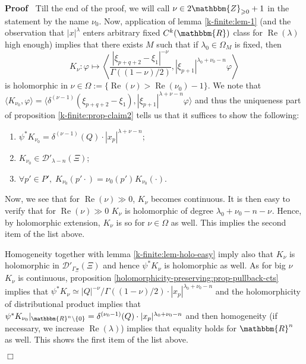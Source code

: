 \documentclass{article}
\newcommand{\assign}{:=}
\newcommand{\nocomma}{}
\newcommand{\tmop}[1]{\ensuremath{\operatorname{#1}}}
\newenvironment{proof}{\noindent\textbf{Proof\ }}{\hspace*{\fill}$\Box$\medskip}
\numberwithin{definition}{section}
\numberwithin{lemma}{section}
\numberwithin{proposition}{section}
{\theorembodyfont{\rmfamily}\newtheorem{remark}{Remark}
\numberwithin{remark}{section}
}
\begin{document}
\begin{proof}
  Till the end of the proof, we will call $\nu_{} \in 2\mathbbm{Z}_{\geqslant
  0} + 1$ in the statement by the name $\nu_0$. Now, application of lemma
  \ref{k-finite:lem-1} (and the observation that $| x |^{\lambda}$ enters
  arbitrary fixed $C^k ( \mathbbm{R})$ class for $\tmop{Re} ( \lambda)$ high
  enough) implies that there exists $M$ such that if $\lambda_0 \in \Omega_M$
  is fixed, then
  \[ K_{\nu} : \varphi \mapsto \left\langle \frac{| \xi_{p + q + 2} - \xi_1
     |^{- \nu}}{\Gamma ( ( 1 - \nu) / 2)} \nocomma, | \xi_{p + 1} |^{\lambda_0
     + \nu_0 - n} \varphi \nocomma \right\rangle \]
  is holomorphic in $\nu \in \Omega \assign \{ \tmop{Re} ( \nu) > \tmop{Re} (
  \nu_0) - 1 \}$. We note that $\langle K_{\nu_0}, \varphi \rangle = \langle
  \delta^{( \nu - 1)} ( \xi_{p + q + 2} - \xi_1) \nocomma, | \xi_{p + 1}
  |^{\lambda + \nu - n} \varphi \nocomma \rangle$ and thus the uniqueness part
  of proposition \ref{k-finite:prop-claim2} tells us that it suffices to show
  the following:
  \begin{enumerate}
    \item $\psi^{\ast} K_{\nu_0} = \delta^{( \nu - 1)} ( Q) \cdot | x_p
    |^{\lambda + \nu - n}$;
    
    \item $K_{\nu_0} \in \mathcal{D}'_{\lambda - n} ( \Xi)$;
    
    \item $\forall p' \in P', \; K_{\nu_0} ( p' \cdot) = \nu_0 ( p')^{}
    K_{\nu_0} ( \cdot)$.
  \end{enumerate}
  Now, we see that for $\tmop{Re} ( \nu) \gg 0$, $K_{\nu}$ becomes continuous.
  It is then easy to verify that for $\tmop{Re} ( \nu) \gg 0$ $K_{\nu}$ is
  holomorphic of degree $\lambda_0 + \nu_0 - n - \nu_{}$. Hence, by
  holomorphic extension, $K_{\nu}$ is so for $\nu \in \Omega$ as well. This
  implies the second item of the list above.
  
  Homogeneity together with lemma \ref{k-finite:lem-holo-easy} imply also that
  $K_{\nu}$ is holomorphic in $\mathcal{D}'_{\Gamma_{\Xi}} ( \Xi)$ and hence
  $\psi^{\ast} K_{\nu}$ is holomorphic as well. As for big $\nu$ $K_{\nu}$ is
  continuous, proposition \ref{holomorphicity-preserving:prop-pullback-cts}
  implies that $\psi^{\ast} K_{\nu} \simeq | Q |^{- \nu} / \Gamma ( ( 1 - \nu)
  / 2) \cdot | x_p |^{\lambda_0 + \nu_0 - n}$ and the holomorphicity of
  distributional product implies that $\psi^{\ast} K_{\nu_0} |_{\mathbbm{R}^n
  \backslash \{ 0 \}} = \delta^{( \nu_0 - 1)} ( Q) \cdot | x_p |^{\lambda_0 +
  \nu_0 - n}$ and then homogeneity (if necessary, we increase $\tmop{Re} (
  \lambda)$) implies that equality holds for $\mathbbm{R}^n$ as well. This
  shows the first item of the list above.
  

\end{proof}
\end{document}

